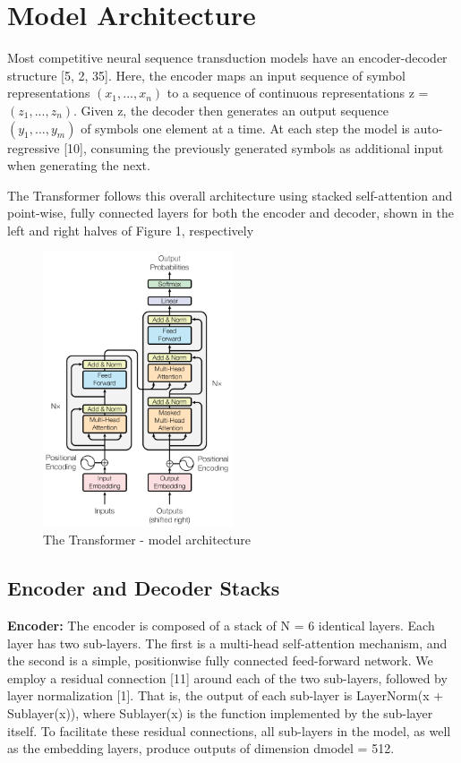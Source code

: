 \documentclass{article}
\begin{document}
\section{Model Architecture}
Most competitive neural sequence transduction models have an encoder-decoder structure [5, 2, 35].
Here, the encoder maps an input sequence of symbol representations $(x_1, ..., x_n)$ to a sequence
of continuous representations z = $(z_1, ..., z_n)$. Given z, the decoder then generates an output
sequence $(y_1,\ldots, y_m)$ of symbols one element at a time. At each step the model is auto-regressive
[10], consuming the previously generated symbols as additional input when generating the next.

\setlength{\parskip}{1em}
\noindent
The Transformer follows this overall architecture using stacked self-attention and point-wise, fully
connected layers for both the encoder and decoder, shown in the left and right halves of Figure 1,
respectively

\begin{figure}[htb]
    \centering
    \includegraphics[width=0.5\textwidth]{figures/fig1.PNG}
    \caption{The Transformer - model architecture}
    \label{fig:transformer-architecture}
\end{figure}

\subsection{Encoder and Decoder Stacks}
\textbf{Encoder:} The encoder is composed of a stack of N = 6 identical layers. Each layer has two
sub-layers. The first is a multi-head self-attention mechanism, and the second is a simple, positionwise fully connected feed-forward network. We employ a residual connection [11] around each of
the two sub-layers, followed by layer normalization [1]. That is, the output of each sub-layer is
LayerNorm(x + Sublayer(x)), where Sublayer(x) is the function implemented by the sub-layer
itself. To facilitate these residual connections, all sub-layers in the model, as well as the embedding
layers, produce outputs of dimension dmodel = 512.
\end{document}
